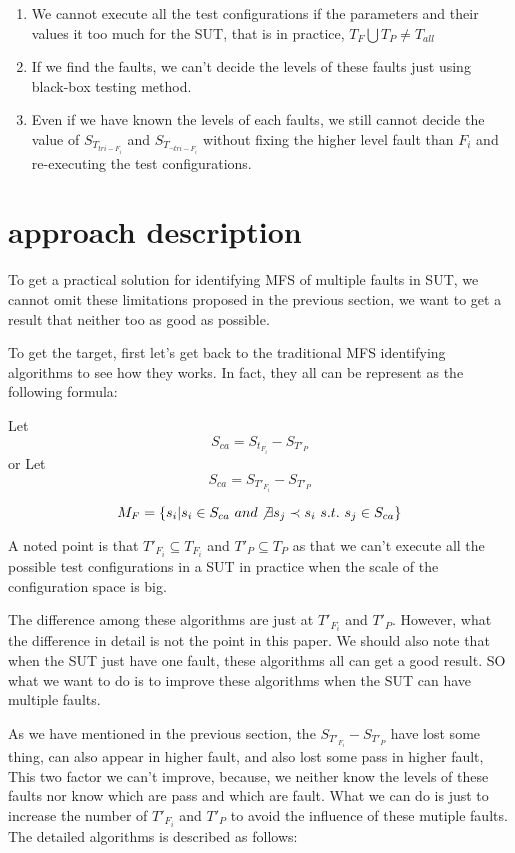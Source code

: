 \documentclass{sig-alternate}
\begin{document}
\begin{enumerate}
 \item We cannot execute all the test configurations if the parameters and their values it too much for the SUT, that is in practice, $T_{F}\bigcup T_{P} \neq T_{all}$

 \item If we find the faults, we can't decide the levels of these faults just using black-box testing method.

 \item Even if we have known the levels of each faults, we still cannot decide the value of $S_{T_{tri-F_{i}}}$ and  $S_{T_{\neg tri-F_{i}}}$ without fixing the higher level fault than $F_{i}$ and re-executing the test configurations.
\end{enumerate}


\section{approach description}

To get a practical solution for identifying MFS of multiple faults in SUT, we cannot omit these limitations proposed in the previous section, we want to get a result that neither too as good as possible.

To get the target, first let's get back to the traditional MFS identifying algorithms to see how they works. In fact, they all can be represent as the following formula:

Let $$S_{ca} = S_{t_{F_{i}}} - S_{T'_{P}}$$  or Let $$S_{ca} = S_{T'_{F_{i}}} - S_{T'_{P}}$$

$$M_{F} = \{s_{i} | s_{i} \in S_{ca}\ and \not\exists s_{j} \prec s_{i}\ s.t.\ s_{j} \in S_{ca} \}$$

A noted point is that  $ T'_{F_{i}} \subseteq T_{F_{i}} $ and $ T'_{P} \subseteq T_{P} $ as that we can't execute all the possible test configurations in a SUT in practice when the scale of the configuration space is big.

The difference among these algorithms are just at $T'_{F_{i}}$ and  $T'_{P}$. However, what the difference in detail is not the point in this paper. We should also note that when the SUT just have one fault, these algorithms all can get a good result. SO what we want to do is to improve these algorithms when the SUT can have multiple faults.

As we have mentioned in the previous section, the $S_{T'_{F_{i}}} - S_{T'_{P}}$ have lost some thing, can also appear in higher fault, and also lost some pass in higher fault, This two factor we can't improve, because, we neither know the levels of these faults nor know which are pass and which are fault. What we can do is just to increase the number of $T'_{F_{i}}$ and $T'_{P}$ to avoid the influence of these mutiple faults. The detailed algorithms is described as follows:
\end{document}

